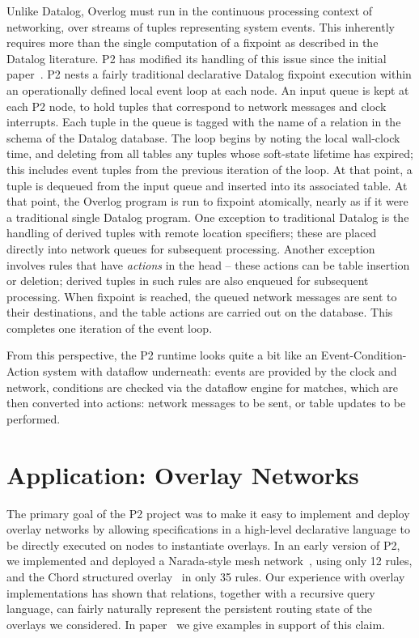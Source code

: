 Unlike Datalog, Overlog must run in the continuous processing context of networking, over streams of tuples representing system events.  This inherently requires more than the single computation of a fixpoint as described in the Datalog literature. P2 has modified its handling of this issue since the initial paper~\cite{p2:sosp}. P2 nests a fairly traditional declarative Datalog fixpoint execution within an operationally defined local event loop at each node.  An input queue is kept at each P2 node, to hold tuples that correspond to network messages and clock interrupts.  Each tuple in the queue is tagged with the name of a relation in the schema of the Datalog database. The loop begins by noting the local wall-clock time, and deleting from all tables any tuples whose soft-state lifetime has expired; this includes event tuples from the previous iteration of the loop.  At that point, a tuple is dequeued from the input queue and inserted into its associated table.  At that point, the Overlog program is run  to fixpoint atomically, nearly as if it were a traditional single Datalog program.  One exception to traditional Datalog is the handling of derived tuples with remote location specifiers; these are placed directly into network queues for subsequent processing. Another exception involves rules that have {\em actions} in the head -- these actions can be table insertion or deletion; derived tuples in such rules are also enqueued for subsequent processing.  When fixpoint is reached, the queued network messages are sent to their destinations, and the table actions are carried out on the database.  This completes one iteration of the event loop.

From this perspective, the P2 runtime looks quite a bit like an Event-Condition-Action system with dataflow underneath: events are provided by the clock and network, conditions are checked via the dataflow engine for matches, which are then converted into actions: network messages to be sent, or table updates to be performed.

\section{Application: Overlay Networks}

The primary goal of the P2 project was to make it easy to implement and
deploy overlay networks by allowing specifications in a high-level
declarative language to be directly executed on nodes to instantiate
overlays. In an early version of P2, we implemented and deployed a
Narada-style mesh network~\cite{chu00case}, using only 12 rules, and the 
Chord structured overlay~\cite{chord} in only 35 rules. 
Our experience with overlay implementations has shown that relations,
together with a recursive query language, can fairly naturally represent the 
persistent routing state of the overlays we considered.  In paper~\cite{p2:sosp} 
we give examples in support of this claim.

